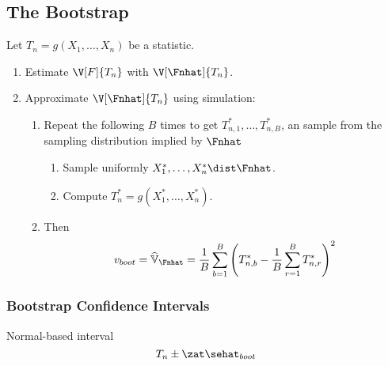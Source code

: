 \documentclass[landscape]{article}
\begin{document}
\begin{multicols*}{2}
\subsection{The Bootstrap}

Let $T_n = g(X_1,\dots,X_n)$ be a statistic.
\begin{enumerate}
  \item Estimate $\V[F]{T_n}$ with $\V[\Fnhat]{T_n}$.
  \item Approximate $\V[\Fnhat]{T_n}$ using simulation:
    \begin{enumerate}
      \item Repeat the following $B$ times to get $T_{n,1}^*,\dots,T_{n,B}^*$,
        an \iid sample from the sampling distribution implied by $\Fnhat$
        \begin{enumerate}
          \item Sample uniformly $X_1^*,\dots,X_n^* \dist \Fnhat$.
          \item Compute $T_n^* = g(X_1^*,\dots,X_n^*)$.
        \end{enumerate}
      \item Then
        \[v_{boot} = \widehat{\mathbb{V}}_{\Fnhat} =
          \displaystyle\frac{1}{B} \sum_{b=1}^B
            \left(T_{n,b}^* - \frac{1}{B} \sum_{r=1}^B T_{n,r}^* \right)^2\]
    \end{enumerate}
\end{enumerate}

\subsubsection{Bootstrap Confidence Intervals}

Normal-based interval
\[T_n \pm \zat\sehat_{boot}\]


\end{multicols*}
\end{document}
